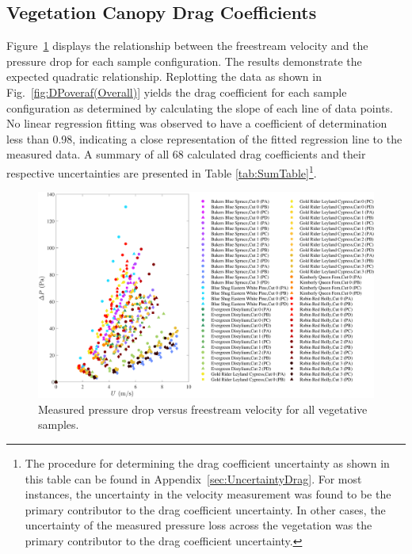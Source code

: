 \documentclass[12pt]{article}
\begin{document}
\pagebreak


\subsection{Vegetation Canopy Drag Coefficients}
\label{ssec:headingscap}

Figure~\ref{fig:DPvU(Overall)} displays the relationship between the freestream velocity and the pressure drop for each sample configuration. The results demonstrate the expected quadratic relationship. Replotting the data as shown in Fig.~\ref{fig:DPoveraf(Overall)} yields the drag coefficient for each sample configuration as determined by calculating the slope of each line of data points. No linear regression fitting was observed to have a coefficient of determination less than 0.98, indicating a close representation of the fitted regression line to the measured data. A summary of all 68 calculated drag coefficients and their respective uncertainties are presented in Table \ref{tab:SumTable}\footnote{The procedure for determining the drag coefficient uncertainty as shown in this table can be found in Appendix~\ref{sec:UncertaintyDrag}. For most instances, the uncertainty in the velocity measurement was found to be the primary contributor to the drag coefficient uncertainty. In other cases, the uncertainty of the measured pressure loss across the vegetation was the primary contributor to the drag coefficient uncertainty.}.

\begin{figure} [!]
	\centering
	\includegraphics[width=\textwidth,keepaspectratio]{Picture8.pdf}
	\caption[Pressure drop versus velocity for all vegetative samples]{Measured pressure drop versus freestream velocity for all vegetative samples.}
	\label{fig:DPvU(Overall)}
\end{figure}
\end{document}

